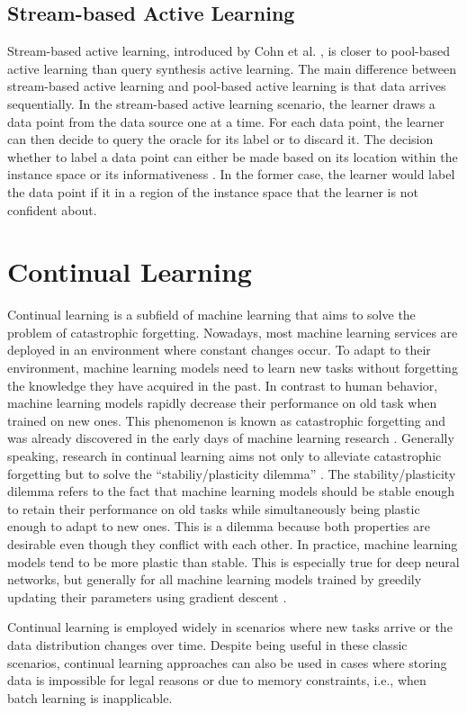 \subsection{Stream-based Active Learning}
\label{sec:StreamBasedActiveLearning}
Stream-based active learning, introduced by Cohn et al. \cite{cohn1994improving}, is closer to pool-based active learning than query synthesis
active learning. The main difference between stream-based active learning and pool-based active learning is that data arrives sequentially.
In the stream-based active learning scenario, the learner draws a data point from the data source
one at a time. For each data point, the learner can then decide to query the oracle for its label or to discard it. The decision whether to label a
data point can either be made based on its location within the instance space \cite{cohn1994improving} or its informativeness \cite{dagan1995committee}.
In the former case, the learner would label the data point if it in a region of the instance space that the learner is not confident about.



\section{Continual Learning}
\label{sec:ContinualLearning}
Continual learning is a subfield of machine learning that aims to solve the problem of catastrophic forgetting. Nowadays, most machine learning services are deployed
in an environment where constant changes occur. To adapt to their environment, machine learning models need to learn new tasks without forgetting the knowledge
they have acquired in the past. In contrast to human behavior, machine learning models rapidly decrease their performance on old task when trained on new ones.
This phenomenon is known as catastrophic forgetting and was already discovered in the early days of machine learning research \cite{mccloskey1989catastrophic}.
Generally speaking, research in continual learning aims not only to alleviate catastrophic forgetting but to solve the 
\enquote{stabiliy/plasticity dilemma} \cite{carpenter1988art}. The stability/plasticity dilemma refers to the fact that machine learning models
should be stable enough to retain their performance on old tasks while simultaneously being plastic enough to adapt to new ones. This is a dilemma
because both properties are desirable even though they conflict with each other. In practice, machine learning models tend to be more plastic than stable.
This is especially true for deep neural networks, but generally for all machine learning models trained by greedily updating their parameters using
gradient descent \cite{mundt2020wholistic}. \par
Continual learning is employed widely in scenarios where new tasks arrive or the data distribution changes over time. Despite being useful
in these classic scenarios, continual learning approaches can also be used in cases where storing data is impossible for legal reasons or due to memory
constraints, i.e., when batch learning is inapplicable. 


